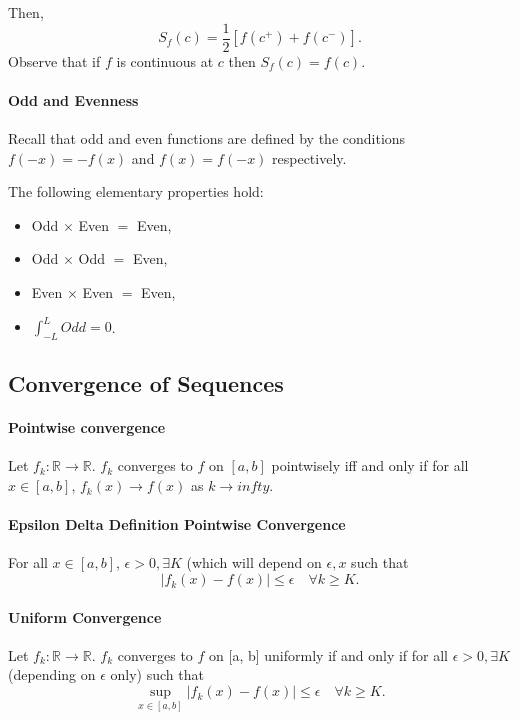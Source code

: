 \documentclass[12pt, letterpaper]{article}
\begin{document}
    Then,
    \[
    S_f(c) = \frac{1}{2} [f(c^+) + f(c^-)].
    \]
    Observe that if \(f\) is continuous at \(c\) then \(S_f(c) = f(c)\).

    \paragraph{Odd and Evenness} 
    Recall that odd and even functions are defined by the conditions \(f(-x) = -f(x)\) and \(f(x) = f(-x)\) respectively.

    The following elementary properties hold:
    \begin{itemize}
        \item Odd \(\times\) Even \(=\) Even,
        \item Odd \(\times\) Odd \(=\) Even,
        \item Even \(\times\) Even \(=\) Even,
        \item \(\int_{-L}^L Odd = 0\).
    \end{itemize}

    \subsection{Convergence of Sequences}
    
    \paragraph{Pointwise convergence}
    Let \(f_k: \mathbb{R} \to \mathbb{R}\). \(f_k\) converges to \(f\) on
    \([a, b]\) pointwisely iff and only if for all \(x\in[a,b]\),
    \(f_k(x)\to f(x)\) as \(k\to infty\).

    \paragraph{Epsilon Delta Definition Pointwise Convergence}
    For all \(x\in [a,b]\), \(\epsilon > 0, \exists K\) (which will depend on \(\epsilon, x\) such that
    \[|f_k(x) - f(x)| \leq \epsilon \quad\forall k \geq K.\]

    \paragraph{Uniform Convergence}
    Let \(f_k: \mathbb{R}\to \mathbb{R}\). \(f_k\) converges to \(f\) on [a, b] uniformly if and only if
    for all \(\epsilon > 0, \exists K\) (depending on \(\epsilon\) only) such that
    \[
    \sup_{x\in [a,b]} |f_k(x) - f(x)| \leq \epsilon \quad\forall k \geq K.
    \]
\end{document}
